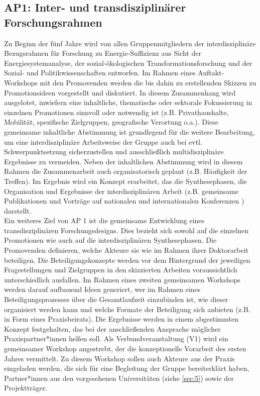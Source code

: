 \documentclass[a4paper,11pt,twoside]{scrartcl}
\begin{document}
\subsection*{AP1: Inter- und transdisziplinärer Forschungsrahmen}
Zu Beginn der fünf Jahre wird von allen Gruppenmitgliedern der interdisziplinäre Bezugsrahmen für Forschung zu Energie-Suffizienz aus Sicht der Energiesystemanalyse, der sozial-ökologischen Transformationsforschung und der Sozial- und Politikwissenschaften entworfen. Im Rahmen eines Auftakt-Workshops mit den Promovenden werden die bis dahin zu erstellenden Skizzen zu Promotionsideen vorgestellt und diskutiert. In diesem Zusammenhang wird ausgelotet, inwiefern eine inhaltliche, thematische oder sektorale Fokussierung in einzelnen Promotionen sinnvoll oder notwendig ist (z.B. Privathaushalte, Mobilität, spezifische Zielgruppen, geografische Verortung o.a.). Diese gemeinsame inhaltliche Abstimmung ist grundlegend für die weitere Bearbeitung, um eine interdisziplinäre Arbeitsweise der Gruppe auch bei evtl. Schwerpunktsetzung sicherzustellen und ausschließlich multidisziplinäre Ergebnisse zu vermeiden. Neben der inhaltlichen Abstimmung wird in diesem Rahmen die Zusammenarbeit auch organisatorisch geplant (z.B. Häufigkeit der Treffen). Im Ergebnis wird ein Konzept erarbeitet, das die Synthesephasen, die Organisation und Ergebnisse der interdisziplinären Arbeit (z.B. gemeinsame Publikationen und Vorträge auf nationalen und internationalen Konferenzen ) darstellt.\\
Ein weiteres Ziel von AP 1 ist die gemeinsame Entwicklung eines transdisziplinären Forschungsdesigns. Dies bezieht sich sowohl auf die einzelnen Promotionen wie auch auf die interdisziplinären Synthesephasen. Die Promovenden definieren, welche Akteure sie wie im Rahmen ihrer Doktorarbeit beteiligen. Die Beteiligungskonzepte werden vor dem Hintergrund der jeweiligen Fragestellungen und Zielgruppen in den skizzierten Arbeiten voraussichtlich unterschiedlich ausfallen. Im Rahmen eines zweiten gemeinsamen Workshops werden darauf aufbauend Ideen generiert, wer im Rahmen eines Beteiligungsprozesses über die Gesamtlaufzeit einzubinden ist, wie dieser organisiert werden kann und welche Formate der Beteiligung sich anbieten (z.B. in Form eines Praxisbeirats). Die Ergebnisse werden in einem abgestimmten Konzept festgehalten, das bei der anschließenden Ansprache möglicher Praxispartner*innen helfen soll. 
Als Verbundveranstaltung (V1) wird ein gemeinsamer Workshop angestrebt, der die konzeptionelle Vorarbeit des ersten Jahres vermittelt. Zu diesem Workshop sollen auch Akteure aus der Praxis eingeladen werden, die sich für eine Begleitung der Gruppe bereiterklärt haben, Partner*innen aus den vorgesehenen Universitäten (siehe \ref{sec:5}) sowie der Projektträger.\\
\end{document}
